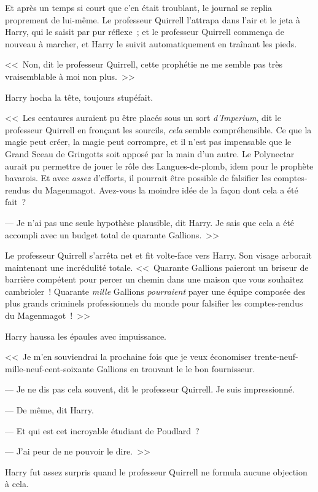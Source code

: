 Et après un temps si court que c'en était troublant, le journal se replia proprement de lui-même. Le professeur Quirrell l'attrapa dans l'air et le jeta à Harry, qui le saisit par pur réflexe~; et le professeur Quirrell commença de nouveau à marcher, et Harry le suivit automatiquement en traînant les pieds.

<<~Non, dit le professeur Quirrell, cette prophétie ne me semble pas très vraisemblable à moi non plus.~>>

Harry hocha la tête, toujours stupéfait.

<<~Les centaures auraient pu être placés sous un sort \emph{d'Imperium}, dit le professeur Quirrell en fronçant les sourcils, \emph{cela} semble compréhensible. Ce que la magie peut créer, la magie peut corrompre, et il n'est pas impensable que le Grand Sceau de Gringotts soit apposé par la main d'un autre. Le Polynectar aurait pu permettre de jouer le rôle des Langues-de-plomb, idem pour le prophète bavarois. Et avec \emph{assez} d'efforts, il pourrait être possible de falsifier les comptes-rendus du Magenmagot. Avez-vous la moindre idée de la façon dont cela a été fait~?

--- Je n'ai pas une seule hypothèse plausible, dit Harry. Je sais que cela a été accompli avec un budget total de quarante Gallions.~>>

Le professeur Quirrell s'arrêta net et fit volte-face vers Harry. Son visage arborait maintenant une incrédulité totale. <<~Quarante Gallions paieront un briseur de barrière compétent pour percer un chemin dans une maison que vous souhaitez cambrioler~! Quarante \emph{mille} Gallions \emph{pourraient} payer une équipe composée des plus grands criminels professionnels du monde pour falsifier les comptes-rendus du Magenmagot~!~>>

Harry haussa les épaules avec impuissance.

<<~Je m'en souviendrai la prochaine fois que je veux économiser trente-neuf-mille-neuf-cent-soixante Gallions en trouvant le le bon fournisseur.

--- Je ne dis pas cela souvent, dit le professeur Quirrell. Je suis impressionné.

--- De même, dit Harry.

--- Et qui est cet incroyable étudiant de Poudlard~?

--- J'ai peur de ne pouvoir le dire.~>>

Harry fut assez surpris quand le professeur Quirrell ne formula aucune objection à cela.

